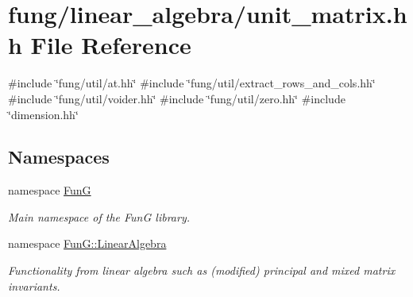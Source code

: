 \hypertarget{unit__matrix_8hh}{\section{fung/linear\-\_\-algebra/unit\-\_\-matrix.hh \-File \-Reference}
\label{unit__matrix_8hh}
}
{\ttfamily \#include \char`\"{}fung/util/at.\-hh\char`\"{}}\*
{\ttfamily \#include \char`\"{}fung/util/extract\-\_\-rows\-\_\-and\-\_\-cols.\-hh\char`\"{}}\*
{\ttfamily \#include \char`\"{}fung/util/voider.\-hh\char`\"{}}\*
{\ttfamily \#include \char`\"{}fung/util/zero.\-hh\char`\"{}}\*
{\ttfamily \#include \char`\"{}dimension.\-hh\char`\"{}}\*
\subsection*{\-Namespaces}
\begin{DoxyCompactItemize}
\item 
namespace \hyperlink{namespaceFunG}{\-Fun\-G}
\begin{DoxyCompactList}\small\item\em \-Main namespace of the \-Fun\-G library. \end{DoxyCompactList}\item 
namespace \hyperlink{namespaceFunG_1_1LinearAlgebra}{\-Fun\-G\-::\-Linear\-Algebra}
\begin{DoxyCompactList}\small\item\em \-Functionality from linear algebra such as (modified) principal and mixed matrix invariants. \end{DoxyCompactList}\end{DoxyCompactItemize}

